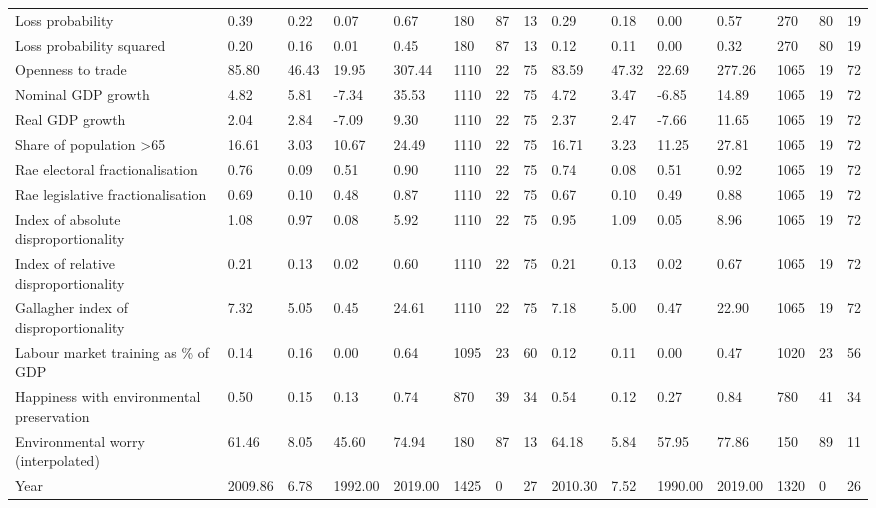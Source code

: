\begin{longtable}{lllllllllllllll}
Loss probability & 0.39 & 0.22 & 0.07 & 0.67 & 180 & 87 & 13 & 0.29 & 0.18 & 0.00 & 0.57 & 270 & 80 & 19\\
\addlinespace
Loss probability squared & 0.20 & 0.16 & 0.01 & 0.45 & 180 & 87 & 13 & 0.12 & 0.11 & 0.00 & 0.32 & 270 & 80 & 19\\
Openness to trade & 85.80 & 46.43 & 19.95 & 307.44 & 1110 & 22 & 75 & 83.59 & 47.32 & 22.69 & 277.26 & 1065 & 19 & 72\\
Nominal GDP growth & 4.82 & 5.81 & -7.34 & 35.53 & 1110 & 22 & 75 & 4.72 & 3.47 & -6.85 & 14.89 & 1065 & 19 & 72\\
Real GDP growth & 2.04 & 2.84 & -7.09 & 9.30 & 1110 & 22 & 75 & 2.37 & 2.47 & -7.66 & 11.65 & 1065 & 19 & 72\\
Share of population >65 & 16.61 & 3.03 & 10.67 & 24.49 & 1110 & 22 & 75 & 16.71 & 3.23 & 11.25 & 27.81 & 1065 & 19 & 72\\
\addlinespace
Rae electoral fractionalisation & 0.76 & 0.09 & 0.51 & 0.90 & 1110 & 22 & 75 & 0.74 & 0.08 & 0.51 & 0.92 & 1065 & 19 & 72\\
Rae legislative fractionalisation & 0.69 & 0.10 & 0.48 & 0.87 & 1110 & 22 & 75 & 0.67 & 0.10 & 0.49 & 0.88 & 1065 & 19 & 72\\
Index of absolute disproportionality & 1.08 & 0.97 & 0.08 & 5.92 & 1110 & 22 & 75 & 0.95 & 1.09 & 0.05 & 8.96 & 1065 & 19 & 72\\
Index of relative disproportionality & 0.21 & 0.13 & 0.02 & 0.60 & 1110 & 22 & 75 & 0.21 & 0.13 & 0.02 & 0.67 & 1065 & 19 & 72\\
Gallagher index of disproportionality & 7.32 & 5.05 & 0.45 & 24.61 & 1110 & 22 & 75 & 7.18 & 5.00 & 0.47 & 22.90 & 1065 & 19 & 72\\
\addlinespace
Labour market training as \% of GDP & 0.14 & 0.16 & 0.00 & 0.64 & 1095 & 23 & 60 & 0.12 & 0.11 & 0.00 & 0.47 & 1020 & 23 & 56\\
Happiness with environmental preservation & 0.50 & 0.15 & 0.13 & 0.74 & 870 & 39 & 34 & 0.54 & 0.12 & 0.27 & 0.84 & 780 & 41 & 34\\
Environmental worry (interpolated) & 61.46 & 8.05 & 45.60 & 74.94 & 180 & 87 & 13 & 64.18 & 5.84 & 57.95 & 77.86 & 150 & 89 & 11\\
Year & 2009.86 & 6.78 & 1992.00 & 2019.00 & 1425 & 0 & 27 & 2010.30 & 7.52 & 1990.00 & 2019.00 & 1320 & 0 & 26\\
\bottomrule
\end{longtable}
